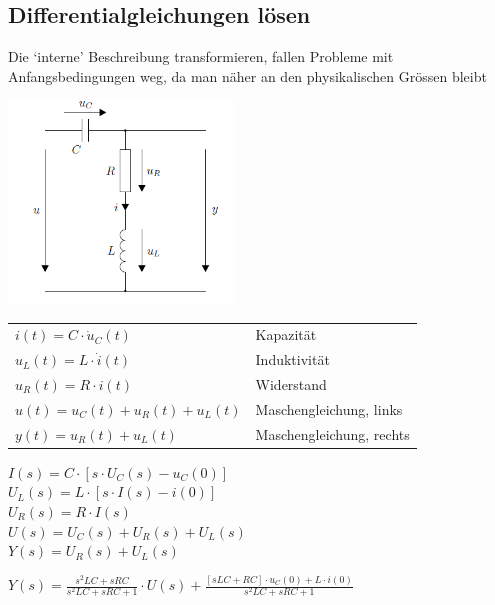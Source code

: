 \subsection{Differentialgleichungen lösen}
Die ‘interne’ Beschreibung transformieren, fallen Probleme mit Anfangsbedingungen weg, da man näher
an den physikalischen Grössen bleibt
\begin{multicols}{2}
		\begin{center}
			\includegraphics[width=6cm]{./images/diffgleichung.png}
		\end{center}
	\columnbreak
\begin{center}
	\begin{tabular}{ll}
		$i(t) = C \cdot \dot{u}_{C}(t)$ & Kapazität  \\
		$u_{L}(t) = L \cdot \dot{i}(t)$ & Induktivität \\
		$u_{R}(t) = R \cdot i(t)$ & Widerstand \\
		$u(t) = u_{C}(t) + u_{R}(t) + u_{L}(t)$ & Maschengleichung, links \\
		$y(t) = u_{R}(t) + u_{L}(t)$ & Maschengleichung, rechts \\
	\end{tabular}
\end{center}
\end{multicols}

\begin{multicols}{2}
{	$I(s) = C  \cdot  [s  \cdot  U_{C}(s) - u_{C}(0)]$ \\
	$U_{L}(s) = L  \cdot  [s  \cdot  I(s) - i(0)]$ \\
	$U_{R}(s) = R  \cdot  I(s)$ \\
	$U(s) = U_{C}(s) + U_{R}(s) + U_{L}(s)$ \\
	$Y (s) = U_{R}(s) + U_{L}(s)$ \\}

	\columnbreak
\begin{center}

$Y(s) = \frac{s^2 LC+sRC}{s^2 LC +sRC +1}\cdot U(s) + \frac{[sLC + RC] \cdot u_{C}(0) + L \cdot i(0)}{s^2 LC +sRC +1}$
\end{center}
\end{multicols}

